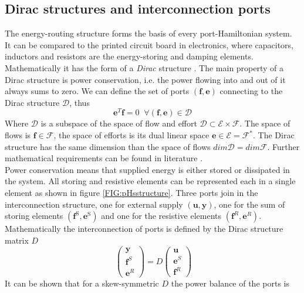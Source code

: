 \documentclass[a4paper,twoside, openright,12pt]{report}
\newcommand{\f}[1]{\boldsymbol{#1}}
\newcommand{\g}[1]{\text{#1}}
\begin{document}
{\subsection{Dirac structures and interconnection ports} \label{SS:PHSinterconnection}
The energy-routing structure forms the basis of every port-Hamiltonian system. It can be compared to the printed circuit board in electronics, where capacitors, inductors and resistors are the energy-storing and damping elements. Mathematically it has the form of a \emph{Dirac} structure \cite{vanderSchaft_06}. The main property of a Dirac structure is power conservation, i.e. the power flowing into and out of it always sums to zero. We can define the set of ports $(\f{f},\f{e})$ connecting to the Dirac structure $\mathcal{D}$, thus 
\begin{equation}
\f{e}^T\f{f} = 0 \;  \; \forall (\f{f},\f{e})\in\mathcal{D}
\end{equation}
Where $\mathcal{D}$ is a subspace of the space of flow and effort $\mathcal{D} \subset \mathcal{E}\times \mathcal{F}$. The space of flows is $\f{f} \in \mathcal{F}$, the space of efforts is its dual linear space $\f{e} \in \mathcal{E} = \mathcal{F}^*$. The Dirac structure has the same dimension than the space of flows $dim \mathcal{D} = dim \mathcal{F}$.
Further mathematical requirements can be found in literature \cite{vanderSchaft_06,Schaft_14}.\\
 Power conservation means that supplied energy is either stored or dissipated in the system. All storing and resistive elements can be represented each in a single element as shown in figure \ref{FIG:pHsstructure}. Three ports join in the interconnection structure, one for external supply $(\f{u},\f{y})$, one for the sum of storing elements $(\f{f}^\g{S},\f{e}^\g{S})$ and one for the resistive elements $(\f{f}^R,\f{e}^R)$. Mathematically the  interconnection of ports is defined by the Dirac structure matrix $D$
\begin{equation}\
\begin{pmatrix}
\f{y} \\ \f{f}^S \\ \f{e}^R
\end{pmatrix} = D \begin{pmatrix}
\f{u} \\ \f{e}^S \\ \f{f}^R
\end{pmatrix}
\end{equation}
It can be shown that for a skew-symmetric $D$ the power balance of the ports is
}
\end{document}
